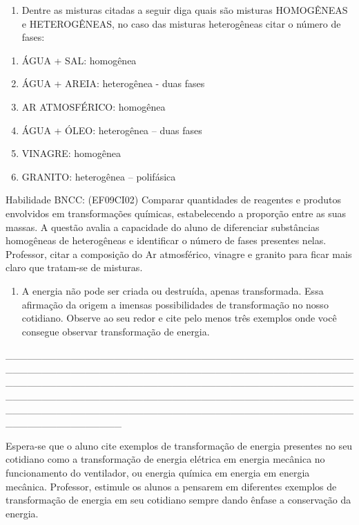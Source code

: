 \begin{enumerate}
\def\labelenumi{\arabic{enumi}.}
\item
  \protect\hypertarget{_Hlk127695965}{}{}Dentre as misturas citadas a
  seguir diga quais são misturas HOMOGÊNEAS e HETEROGÊNEAS, no caso das
  misturas heterogêneas citar o número de fases:
\end{enumerate}

\begin{enumerate}
\def\labelenumi{\alph{enumi})}
\item
  ÁGUA + SAL: homogênea
\item
  ÁGUA + AREIA: heterogênea - duas fases
\item
  AR ATMOSFÉRICO: homogênea
\item
  ÁGUA + ÓLEO: heterogênea -- duas fases
\item
  VINAGRE: homogênea
\item
  GRANITO: heterogênea -- polifásica
\end{enumerate}

Habilidade BNCC: (EF09CI02) Comparar quantidades de reagentes e produtos
envolvidos em transformações químicas, estabelecendo a proporção entre
as suas massas. A questão avalia a capacidade do aluno de diferenciar
substâncias homogêneas de heterogêneas e identificar o número de fases
presentes nelas. Professor, citar a composição do Ar atmosférico,
vinagre e granito para ficar mais claro que tratam-se de misturas.

\begin{enumerate}
\def\labelenumi{\arabic{enumi}.}
\item
  A energia não pode ser criada ou destruída, apenas transformada. Essa
  afirmação da origem a imensas possibilidades de transformação no nosso
  cotidiano. Observe ao seu redor e cite pelo menos três exemplos onde
  você consegue observar transformação de energia.
\end{enumerate}

\_\_\_\_\_\_\_\_\_\_\_\_\_\_\_\_\_\_\_\_\_\_\_\_\_\_\_\_\_\_\_\_\_\_\_\_\_\_\_\_\_\_\_\_\_\_\_\_\_\_\_\_\_\_\_\_\_\_\_\_\_\_\_\_\_\_\_\_\_\_\_\_\_\_\_\_\_\_\_\_\_\_\_\_\_\_\_\_\_\_\_\_\_\_\_\_\_\_\_\_\_\_\_\_\_\_\_\_\_\_\_\_\_\_\_\_\_\_\_\_\_\_\_\_\_\_\_\_\_\_\_\_\_\_\_\_\_\_\_\_\_\_\_\_\_\_\_\_\_\_\_\_\_\_\_\_\_\_\_\_\_\_\_\_\_\_\_\_\_\_\_\_\_\_\_\_\_\_\_\_\_\_\_\_\_\_\_\_\_\_\_\_\_\_\_\_\_\_\_\_\_\_\_\_\_\_\_\_\_\_\_\_\_\_\_\_\_\_\_\_\_\_\_\_\_\_\_\_\_\_\_\_\_\_\_\_\_\_\_\_\_\_\_\_\_\_\_\_\_\_\_\_\_\_\_\_

Espera-se que o aluno cite exemplos de transformação de energia
presentes no seu cotidiano como a transformação de energia elétrica em
energia mecânica no funcionamento do ventilador, ou energia química em
energia em energia mecânica. Professor, estimule os alunos a pensarem em
diferentes exemplos de transformação de energia em seu cotidiano sempre
dando ênfase a conservação da energia.

